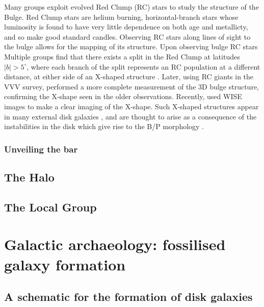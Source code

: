 Many groups exploit evolved Red Clump (RC) stars to study the structure of the Bulge. Red Clump stars are helium burning, horizontal-branch stars whose luminosity is found to have very little dependence on both age and metallicty, and so make good standard candles. Observing RC stars along lines of sight to the bulge allows for the mapping of its structure. Upon observing bulge RC stars Multiple groups find that there exists a split in the Red Clump at latitudes $|b| > 5^{\circ}$, where each branch of the split represents an RC population at a different distance, at either side of an X-shaped structure \citep{2010ApJ...721L..28N,2010ApJ...724.1491M,2011AJ....142...76S}. Later, using RC giants in the VVV survey, \citet{2013MNRAS.435.1874W} performed a more complete measurement of the 3D bulge structure, confirming the X-shape seen in the older observations. Recently, \citet{2016AJ....152...14N} used WISE images to make a clear imaging of the X-shape. Such X-shaped structures appear in many external disk galaxies \citep[e.g.][]{2006MNRAS.370..753B}, and are thought to arise as a consequence of the instabilities in the disk which give rise to the B/P morphology \citep[based on studies of N-body simulations, e.g.][]{2005MNRAS.358.1477A,2006ApJ...645..209D}.





\subsubsection{Unveiling the bar}


\subsection{The Halo}

\subsection{The Local Group}

\section{Galactic archaeology: fossilised galaxy formation}
\label{sec:galacticarchaeology}
\subsection{A schematic for the formation of disk galaxies}

